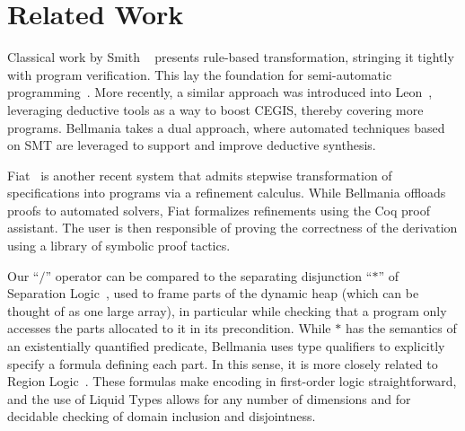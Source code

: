 \section{Related Work}
\label{related}

Classical work by Smith \etal~\cite{AI85/Smith} presents rule-based transformation, stringing it
tightly with program verification. This lay the foundation for semi-automatic programming~\cite{CPS91/Blaine,TSE90/Smith,TPHOLs96/Butler}.
More recently, a similar approach was introduced into Leon~\cite{OOPSLA13/Kneuss}, leveraging deductive
tools as a way to boost CEGIS, thereby covering more programs. Bellmania takes a dual approach, where
automated techniques based on SMT are leveraged to support and improve deductive synthesis.

Fiat~\cite{POPL15/Delaware} is another recent system that admits stepwise transformation of specifications
into programs via a refinement calculus. While Bellmania offloads proofs to automated solvers,
Fiat formalizes refinements using the Coq proof assistant. The user is then responsible of proving
the correctness of the derivation using a library of symbolic proof tactics.

Our ``$\big/$'' operator can be compared to the separating disjunction ``$\ast$'' of Separation Logic~\cite{LICS02/Reynolds},
used to frame parts of the dynamic heap (which can be thought of as one large array),
in particular while checking that a program only accesses the parts allocated to it in its precondition.
While $\ast$ has the semantics of an existentially quantified predicate, Bellmania uses type qualifiers
to explicitly specify a formula defining each part. In this sense, it is more closely related to
Region Logic~\cite{ECOOP08/Banerjee}. These formulas make encoding in first-order logic straightforward,
and the use of Liquid Types allows for any number of dimensions and for decidable checking of domain inclusion
and disjointness.
